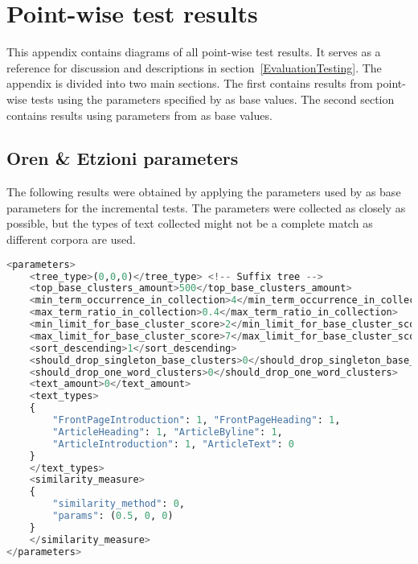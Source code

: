 
\chapter{Point-wise test results} %

\label{AppendixA} %


This appendix contains diagrams of all point-wise test results. It serves as a reference for discussion and descriptions in section~\ref{EvaluationTesting}. The appendix is divided into two main sections. The first contains results from point-wise tests using the parameters specified by \citeauthor{Oren1998} as base values. The second section contains results using parameters from \citeauthor{Moe2014compact} as base values.

\section{Oren \& Etzioni parameters}

The following results were obtained by applying the parameters used by \citeauthor{Oren1998} as base parameters for the incremental tests. The parameters were collected as closely as possible, but the types of text collected might not be a complete match as different corpora are used.

\begin{lstlisting}[float=t, language=python, label=lst:etzioniparams, caption={Parameter set used in Oren and Etzioni.}]
<parameters>
    <tree_type>(0,0,0)</tree_type> <!-- Suffix tree -->
    <top_base_clusters_amount>500</top_base_clusters_amount>
    <min_term_occurrence_in_collection>4</min_term_occurrence_in_collection>
    <max_term_ratio_in_collection>0.4</max_term_ratio_in_collection>
    <min_limit_for_base_cluster_score>2</min_limit_for_base_cluster_score>
    <max_limit_for_base_cluster_score>7</max_limit_for_base_cluster_score>
    <sort_descending>1</sort_descending>
    <should_drop_singleton_base_clusters>0</should_drop_singleton_base_clusters>
    <should_drop_one_word_clusters>0</should_drop_one_word_clusters>
    <text_amount>0</text_amount>
    <text_types>
    {
    	"FrontPageIntroduction": 1, "FrontPageHeading": 1,
    	"ArticleHeading": 1, "ArticleByline": 1,
    	"ArticleIntroduction": 1, "ArticleText": 0
    }
    </text_types>
    <similarity_measure>
    {
    	"similarity_method": 0,
    	"params": (0.5, 0, 0)
    }
   	</similarity_measure>
</parameters>
\end{lstlisting}

